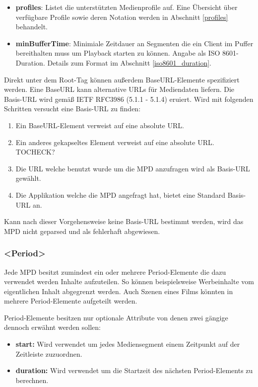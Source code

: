 \documentclass[paper = a4, fontsize = 12pt, parskip = half]{scrartcl} %
\begin{document}
\begin{itemize}
	\item \textbf{profiles}: Listet die unterstützten Medienprofile auf. Eine Übersicht über verfügbare Profile sowie deren Notation werden in Abschnitt \ref{profiles} behandelt.
	\item \textbf{minBufferTime}: Minimiale Zeitdauer an Segmenten die ein Client im Puffer bereithalten muss um Playback starten zu können. Angabe als ISO 8601-Duration. Details zum Format im Abschnitt \ref{iso8601_duration}.
\end{itemize}

Direkt unter dem Root-Tag können außerdem BaseURL-Elemente spezifiziert werden. Eine BaseURL kann alternative URLs für Mediendaten liefern.
Die Basis-URL wird gemäß IETF RFC3986 (5.1.1 - 5.1.4) eruiert. Wird mit folgenden Schritten versucht eine Basis-URL zu finden:

\begin{enumerate}
	\item Ein BaseURL-Element verweist auf eine absolute URL.
	\item Ein anderes gekapseltes Element verweist auf eine absolute URL. TOCHECK?
	\item Die URL welche benutzt wurde um die MPD anzufragen wird als Basis-URL gewählt.
	\item Die Applikation welche die MPD angefragt hat, bietet eine Standard Basis-URL an.
\end{enumerate}

Kann nach dieser Vorgehensweise keine Basis-URL bestimmt werden, wird das MPD nicht geparsed und als fehlerhaft abgewiesen.

\subsubsection{<Period>}
Jede MPD besitzt zumindest ein oder mehrere Period-Elemente die dazu verwendet werden Inhalte aufzuteilen. So können beispielsweise Werbeinhalte vom eigentlichen Inhalt abgegrenzt werden. Auch Szenen eines Films könnten in mehrere Period-Elemente aufgeteilt werden.

Period-Elemente besitzen nur optionale Attribute von denen zwei gängige dennoch erwähnt werden sollen:
\begin{itemize}
	\item \textbf{start:} Wird verwendet um jedes Mediensegment einem Zeitpunkt auf der Zeitleiste zuzuordnen.
	\item \textbf{duration:} Wird verwendet um die Startzeit des nächsten Period-Elements zu berechnen.
\end{itemize}
\end{document}
